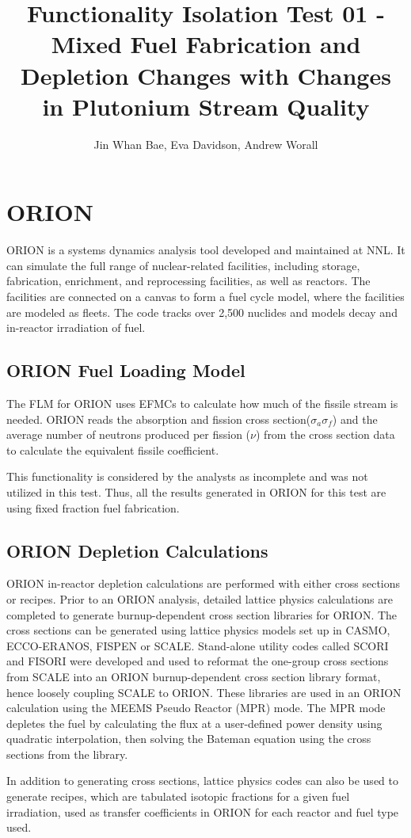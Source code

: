 \documentclass{article}
\title{Functionality Isolation Test 01 - Mixed Fuel Fabrication and Depletion Changes with
        Changes in Plutonium Stream Quality}
\author{Jin Whan Bae, Eva Davidson, Andrew Worall}
\begin{document}
\section{ORION}
ORION \cite{gregg_benefits_2013} is a systems dynamics analysis tool developed and maintained at \gls{NNL}.
It can simulate the full range of nuclear-related facilities, including storage, fabrication, enrichment,
and reprocessing facilities, as well as reactors. The facilities are connected on a canvas to form a
fuel cycle model, where the facilities are modeled as fleets. The code tracks over 2,500 nuclides
and models decay and in-reactor irradiation of fuel.

\subsection{ORION Fuel Loading Model}
The \gls{FLM} for ORION uses \glspl{EFMC} to calculate how much of the fissile stream is needed. ORION reads
the absorption and fission cross section($\sigma_a \sigma_f$) and the average number of neutrons produced per fission ($\nu$)
from the cross section data to calculate the equivalent fissile coefficient.

This functionality is considered by the analysts as incomplete and was not utilized in this test. Thus, all the results
generated in ORION for this test are using fixed fraction fuel fabrication.

\subsection{ORION Depletion Calculations}
ORION in-reactor depletion calculations are performed with either cross sections or recipes.
Prior to an ORION analysis, detailed lattice physics calculations are completed to generate burnup-dependent
cross section libraries for ORION. The cross sections can be generated using lattice physics models set up in CASMO,
ECCO-ERANOS, FISPEN or SCALE. Stand-alone utility codes called SCORI and FISORI were developed and used to reformat
the one-group cross sections from SCALE into an ORION burnup-dependent cross section library format, hence loosely
coupling SCALE to ORION. These libraries are used in an ORION calculation using the MEEMS Pseudo Reactor (MPR) mode.
The MPR mode depletes the fuel by calculating the flux at a user-defined power density using quadratic interpolation,
 then solving the Bateman equation using the cross sections from the library. 

In addition to generating cross sections, lattice physics codes can also be used to generate recipes, which are
tabulated isotopic fractions for a given fuel irradiation, used as transfer coefficients in ORION for each 
reactor and fuel type used. 
\end{document}

